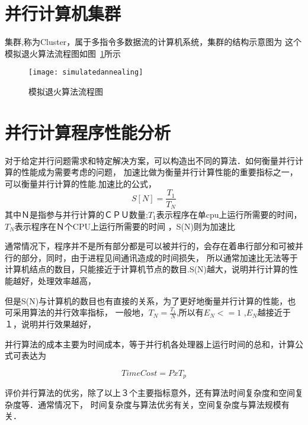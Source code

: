 \section{并行计算机集群}
    集群,称为Cluster，属于多指令多数据流的计算机系统，集群的结构示意图为
   这个模拟退火算法流程图如图~\ref{fig:simulatedannealing}所示

    \begin{figure}[htbp]
    \centering
    \texttt{[image: simulatedannealing]}
    \caption{模拟退火算法流程图}\label{fig:simulatedannealing}
    \vspace{\baselineskip}
    \end{figure}

    

\section{并行计算程序性能分析}
    对于给定并行问题需求和特定解决方案，可以构造出不同的算法．如何衡量并行计算的性能成为需要考虑的问题，
加速比做为衡量并行计算性能的重要指标之一，可以衡量并行计算的性能.加速比的公式，
    \[  S[N] = \frac{T_1}{T_N}  \]
其中Ｎ是指参与并行计算的ＣＰＵ数量;$T_1$表示程序在单cpu上运行所需要的时间，$T_N$表示程序在Ｎ个CPU上运行所需要的时间
，S(N)则为加速比
    
    通常情况下，程序并不是所有部分都是可以被并行的，会存在着串行部分和可被并行的部分，同时，由于进程见间通讯造成的时间损失，
所以通常加速比无法等于计算机结点的数目，只能接近于计算机节点的数目.S(N)越大，说明并行计算的性能越好，处理效率越高，

    但是S(N)与计算机的数目也有直接的关系，为了更好地衡量并行计算的性能，也可采用算法的并行效率指标，
一般地，$T_N = \frac{T_1}{N}$,所以有$E_N <= 1 $ ,$E_N$越接近于１，说明并行效果越好，

    并行算法的成本主要为时间成本，等于并行机各处理器上运行时间的总和，计算公式可表达为
    
    \[ TimeCost=PxT_p  \]

    评价并行算法的优劣，除了以上３个主要指标意外，还有算法时间复杂度和空间复杂度等．通常情况下，
时间复杂度与算法优劣有关，空间复杂度与算法规模有关．
